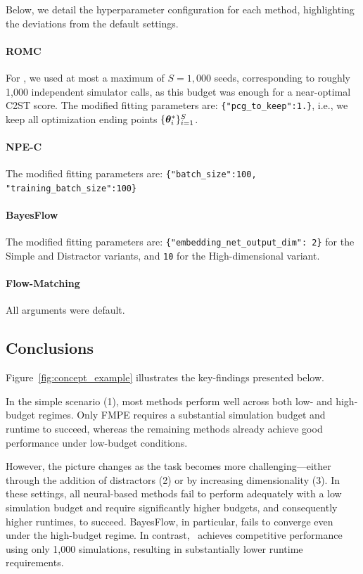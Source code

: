 Below, we detail the hyperparameter configuration for each method, highlighting the deviations from the default settings.

\paragraph{ROMC} 
For \rromc, we used at most a maximum of $S = 1{,}000$ seeds, corresponding to roughly 1{,}000 independent simulator calls, as this budget was enough for a near-optimal C2ST score.
The modified fitting parameters are: \texttt{\{"pcg\_to\_keep":1.\}}, i.e., we keep all optimization ending points $\{\boldsymbol{\theta}_i^*\}_{i=1}^{S}$.

\paragraph{NPE-C} 
The modified fitting parameters are:
\texttt{\{"batch\_size":100, "training\_batch\_size":100\}}

\paragraph{BayesFlow} 
The modified fitting parameters are: \texttt{\{"embedding\_net\_output\_dim": 2\}} for the Simple and Distractor variants, and \texttt{10} for the High-dimensional variant.

\paragraph{Flow-Matching} All arguments were default.

\subsection{Conclusions}

Figure~\ref{fig:concept_example} illustrates the key-findings presented below.

In the simple scenario (1), most methods perform well across both low- and high-budget regimes. Only FMPE requires a substantial simulation budget and runtime to succeed, whereas the remaining methods already achieve good performance under low-budget conditions.

However, the picture changes as the task becomes more challenging—either through the addition of distractors (2) or by increasing dimensionality (3). In these settings, all neural-based methods fail to perform adequately with a low simulation budget and require significantly higher budgets, and consequently higher runtimes, to succeed. BayesFlow, in particular, fails to converge even under the high-budget regime. In contrast, \rromc~achieves competitive performance using only 1,000 simulations, resulting in substantially lower runtime requirements.


